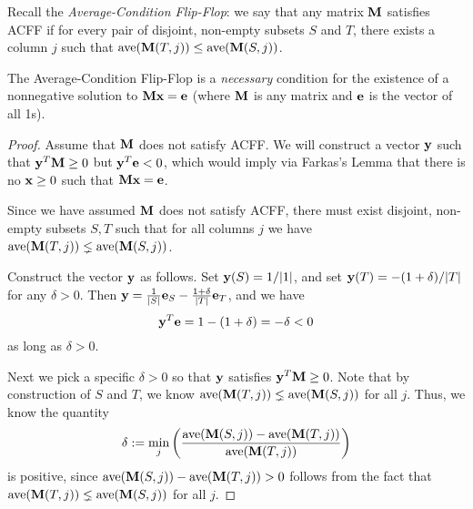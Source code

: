 Recall the \emph{Average-Condition Flip-Flop}: we say that any matrix $\textbf{M}$ satisfies ACFF if for every pair of disjoint, non-empty subsets $S$ and $T$, there exists a column $j$ such that $\operatorname{ave}(\textbf{M}(T,j)) \leq \operatorname{ave}(\textbf{M}(S,j))$.
\begin{lemma}
  The Average-Condition Flip-Flop is a \emph{necessary} condition for the existence of a nonnegative solution to $\textbf{M}\textbf{x} = \textbf{e}$ (where $\textbf{M}$ is any matrix and $\textbf{e}$ is the vector of all 1s).
\end{lemma}
\begin{proof}
  Assume that $\textbf{M}$ does not satisfy ACFF. We will construct a vector $\textbf{y}$ such that $\textbf{y}^T\textbf{M} \geq 0$ but $\textbf{y}^T\textbf{e} < 0$, which would imply via Farkas's Lemma that there is no $\textbf{x} \geq 0$ such that $\textbf{M}\textbf{x} = \textbf{e}$.


Since we have assumed $\textbf{M}$ does not satisfy ACFF, there must exist disjoint, non-empty subsets $S,T$ such that for all columns $j$ we have $\operatorname{ave}(\textbf{M}(T,j)) \lneq \operatorname{ave}(\textbf{M}(S,j))$.

  Construct the vector $\textbf{y}$ as follows. Set $\textbf{y}(S) = 1/|1|$, and set $\textbf{y}(T) = -(1+\delta)/|T|$ for any $\delta > 0$.
  Then $\textbf{y} = \tfrac{1}{|S|}\textbf{e}_S - \tfrac{1+\delta}{|T|}\textbf{e}_T$, and we have
  \[
    \textbf{y}^T\textbf{e} = 1 - (1+\delta) = -\delta < 0
  \]
  as long as $\delta > 0$.

  Next we pick a specific $\delta > 0$ so that $\textbf{y}$ satisfies $\textbf{y}^T\textbf{M} \geq 0$.
  Note that by construction of $S$ and $T$, we know $\operatorname{ave}(\textbf{M}(T,j)) \lneq \operatorname{ave}(\textbf{M}(S,j))$ for all $j$.
  Thus, we know the quantity
  \begin{equation}
    \delta := \displaystyle\min_j \left(  \frac{\operatorname{ave}(\textbf{M}(S,j)) - \operatorname{ave}(\textbf{M}(T,j))}{\operatorname{ave}(\textbf{M}(T,j))}   \right)
  \end{equation}
  is positive, since   $\operatorname{ave}(\textbf{M}(S,j)) - \operatorname{ave}(\textbf{M}(T,j)) > 0$ follows from the fact that $\operatorname{ave}(\textbf{M}(T,j)) \lneq \operatorname{ave}(\textbf{M}(S,j))$ for all $j$.


\end{proof}
